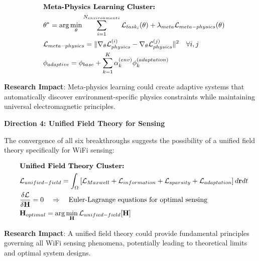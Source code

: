 \documentclass[journal]{IEEEtran}
\begin{document}
\begin{align}
&\hspace{2em} \text{\textbf{Meta-Physics Learning Cluster:}} \quad &  \nonumber \\
&\hspace{2em} \theta^* = \arg\min_{\theta} \sum_{i=1}^{N_{environments}} \mathcal{L}_{task_i}(\theta) + \lambda_{meta} \mathcal{L}_{meta-physics}(\theta) \label{eq:meta_physics_optimization} \\
&\hspace{2em} \mathcal{L}_{meta-physics} = \|\nabla_{\theta} \mathcal{L}_{physics}^{(i)} - \nabla_{\theta} \mathcal{L}_{physics}^{(j)}\|^2 \quad \forall i,j \label{eq:physics_consistency} \\
&\hspace{2em} \phi_{adaptive} = \phi_{base} + \sum_{k=1}^{K} \alpha_k^{(env)} \phi_k^{(adaptation)} \label{eq:adaptive_physics}
\end{align}

\textbf{Research Impact}: Meta-physics learning could create adaptive systems that automatically discover environment-specific physics constraints while maintaining universal electromagnetic principles.

\textbf{Direction 4: Unified Field Theory for Sensing}

The convergence of all six breakthroughs suggests the possibility of a unified field theory specifically for WiFi sensing:

\begin{align}
&\hspace{2em} \text{\textbf{Unified Field Theory Cluster:}} \quad &  \nonumber \\
&\hspace{2em} \mathcal{L}_{unified-field} = \int_{\Omega} \left[ \mathcal{L}_{Maxwell} + \mathcal{L}_{information} + \mathcal{L}_{sparsity} + \mathcal{L}_{adaptation} \right] d\mathbf{r}dt \label{eq:unified_field_lagrangian} \\
&\hspace{2em} \frac{\delta \mathcal{L}}{\delta \mathbf{H}} = 0 \quad \Rightarrow \quad \text{Euler-Lagrange equations for optimal sensing} \label{eq:sensing_euler_lagrange} \\
&\hspace{2em} \mathbf{H}_{optimal} = \arg\min_{\mathbf{H}} \mathcal{L}_{unified-field}[\mathbf{H}] \label{eq:optimal_sensing_field}
\end{align}

\textbf{Research Impact}: A unified field theory could provide fundamental principles governing all WiFi sensing phenomena, potentially leading to theoretical limits and optimal system designs.
\end{document}
